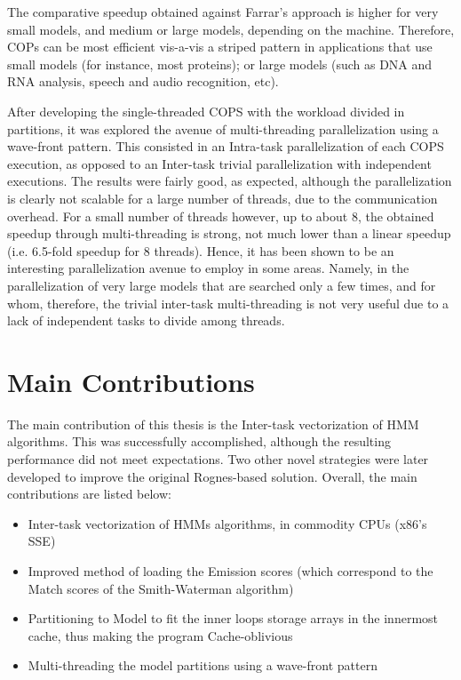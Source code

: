 The comparative speedup obtained against Farrar's approach is higher for very small models, and medium or large models, depending on the machine. Therefore, COPs can be most efficient vis-a-vis a striped pattern in applications that use small models (for instance, most proteins); or large models (such as DNA and RNA analysis, speech and audio recognition, etc).


After developing the single-threaded COPS with the workload divided in partitions, it was explored the avenue of multi-threading parallelization using a wave-front pattern. This consisted in an Intra-task parallelization of each COPS execution, as opposed to an Inter-task trivial parallelization with independent executions. The results were fairly good, as expected, although the parallelization is clearly not scalable for a large number of threads, due to the communication overhead. For a small number of threads however, up to about 8, the obtained speedup through multi-threading is strong, not much lower than a linear speedup (i.e. 6.5-fold speedup for 8 threads). Hence, it has been shown to be an interesting parallelization avenue to employ in some areas. Namely, in the parallelization of very large models that are searched only a few times, and for whom, therefore, the trivial inter-task multi-threading is not very useful due to a lack of independent tasks to divide among threads. 



\section{Main Contributions}

The main contribution of this thesis is the Inter-task vectorization of HMM algorithms. This was successfully accomplished, although the resulting performance did not meet expectations. Two other novel strategies were later developed to improve the original Rognes-based solution. Overall, the main contributions are listed below:

\begin{itemize}
\item Inter-task vectorization of \acp{HMM} algorithms, in commodity CPUs (x86's SSE)

\item Improved method of loading the Emission scores (which correspond to the Match scores of the Smith-Waterman algorithm)

\item Partitioning to Model to fit the inner loops storage arrays in the innermost cache, thus making the program Cache-oblivious

\item Multi-threading the model partitions using a wave-front pattern

\end{itemize}




